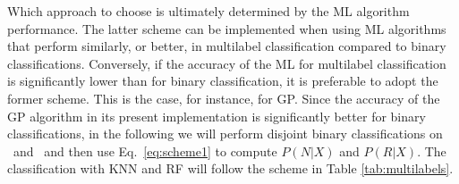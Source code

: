 


Which approach to choose is ultimately determined by the \ac{ML} algorithm performance. The latter scheme can be implemented when using \ac{ML} algorithms that perform similarly, or
better, in multilabel classification compared to binary classifications. Conversely, if the accuracy of the \ac{ML} for multilabel classification is significantly lower than for binary
classification, it is preferable to adopt the former scheme. This is the case, for instance, for \ac{GP}. Since the accuracy of the \ac{GP} algorithm in its present implementation is
significantly better for binary classifications, in the following we will perform disjoint binary classifications on \hasns\ and \hasrem\ and then use Eq.~\ref{eq:scheme1} to compute
$P(N|X)$ and $P(R|X)$. The classification with \ac{KNN} and \ac{RF} will follow the scheme in Table \ref{tab:multilabels}. 
